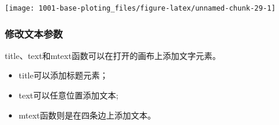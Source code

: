 \documentclass[
]{book}
\providecommand{\tightlist}{%
  \setlength{\itemsep}{0pt}\setlength{\parskip}{0pt}}
\begin{document}
\begin{center}\texttt{[image: 1001-base-ploting\_files/figure-latex/unnamed-chunk-29-1]} \end{center}

\hypertarget{ux4feeux6539ux6587ux672cux53c2ux6570}{%
\subsubsection{修改文本参数}\label{ux4feeux6539ux6587ux672cux53c2ux6570}}

title、text和mtext函数可以在打开的画布上添加文字元素。

\begin{itemize}
\tightlist
\item
  title可以添加标题元素；
\item
  text可以任意位置添加文本;
\item
  mtext函数则是在四条边上添加文本。
\end{itemize}
\end{document}
